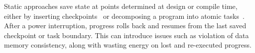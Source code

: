 Static approaches save state at points determined at design or compile time, either by inserting checkpoints~\cite{Ransford:2011:MSS:1950365.1950386, 7944791} or decomposing a program into atomic tasks~\cite{10.1145/3360285, Maeng:2017:AIE:3152284.3133920}. After a power interruption, progress rolls back and resumes from the last saved checkpoint or task boundary. This can introduce issues such as violation of data memory consistency, along with wasting energy on lost and re-executed progress.

